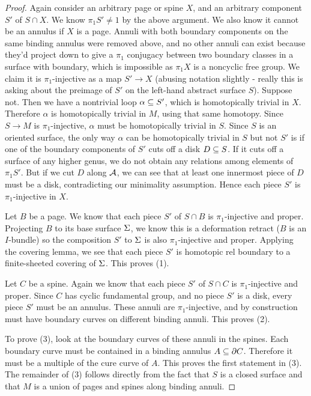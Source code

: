 \begin{proof}
Again consider an arbitrary page or spine $X$, and an arbitrary component $S'$
of $S \cap X$.  We know $\pi_1S' \neq 1$ by the above argument. We also know it
cannot be an annulus if $X$ is a page. Annuli with both boundary components on
the same binding annulus were removed above, and no other annuli can exist
because they'd project down to give a $\pi_1$ conjugacy between two boundary
classes in a surface with boundary, which is impossible as $\pi_1X$ is
a noncyclic free group.  We claim it is $\pi_1$-injective as a map $S' \to X$
(abusing notation slightly - really this is asking about the preimage of $S'$
on the left-hand abstract surface $S$).  Suppose not. Then we have a nontrivial
loop $\alpha \subseteq S'$, which is homotopically trivial in $X$.  Therefore
$\alpha$ is homotopically trivial in $M$, using that same homotopy.  Since $S
\to M$ is $\pi_1$-injective, $\alpha$ must be homotopically trivial in $S$.
Since $S$ is an oriented surface, the only way $\alpha$ can be homotopically
trivial in $S$ but not $S'$ is if one of the boundary components of $S'$ cuts
off a disk $D \subseteq S$. If it cuts off a surface of any higher genus, we do not
obtain any relations among elements of $\pi_1S'$.  But if we cut $D$ along
$\mathcal{A}$, we can see that at least one innermost piece of $D$ must be a disk,
contradicting our minimality assumption.  Hence each piece $S'$ is
$\pi_1$-injective in $X$.

Let $B$ be a page. We know that each piece $S'$ of $S \cap B$ is
$\pi_1$-injective and proper. Projecting $B$ to its base surface $\Sigma$, we know
this is a deformation retract ($B$ is an $I$-bundle) so the composition $S'$ to
$\Sigma$ is also $\pi_1$-injective and proper. Applying the covering lemma, we see
that each piece $S'$ is homotopic rel boundary to a finite-sheeted covering of
$\Sigma$.  This proves (1).

Let $C$ be a spine. Again we know that each piece $S'$ of $S \cap C$ is
$\pi_1$-injective and proper. Since $C$ has cyclic fundamental group, and no
piece $S'$ is a disk, every piece $S'$ must be an annulus. These annuli are
$\pi_1$-injective, and by construction must have boundary curves on different
binding annuli.  This proves (2).

To prove (3), look at the boundary curves of these annuli in the spines. Each
boundary curve must be contained in a binding annulus $A \subseteq \partial C$. Therefore
it must be a multiple of the cure curve of $A$. This proves the first statement
in (3). The remainder of (3) follows directly from the fact that $S$ is
a closed surface and that $M$ is a union of pages and spines along binding
annuli.

\end{proof}

